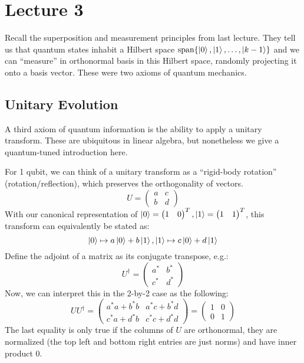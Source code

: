
\section{Lecture 3}

Recall the superposition and measurement principles from last lecture. They tell us that quantum states inhabit a Hilbert space
$\text{span}\{\ket{0}, \ket{1}, \dots, \ket{k - 1}\}$ and we can ``measure'' in orthonormal basis in this Hilbert space, randomly projecting it onto
a basis vector. These were two axioms of quantum mechanics.

\subsection{Unitary Evolution}
A third axiom of quantum information is the ability to apply a unitary transform. These are ubiquitous in linear algebra,
but nonetheless we give a quantum-tuned introduction here.

For 1 qubit, we can think of a unitary transform as a ``rigid-body rotation'' (rotation/reflection), which preserves the orthogonality of vectors.
\[ U = \begin{pmatrix}
    a & c \\ b & d
\end{pmatrix} \]
With our canonical representation of $\ket{0} = \begin{pmatrix}
    1 & 0
\end{pmatrix}^T, \ket{1} = \begin{pmatrix}
    1 & 1
\end{pmatrix}^T$, this transform can equivalently be stated as:
\[ \ket{0} \mapsto a\ket{0} + b \ket{1}, \ket{1} \mapsto c \ket{0} + d \ket{1} \]
Define the adjoint of a matrix as its conjugate transpose, e.g.:
\[ U^{\dagger} = \begin{pmatrix}
    a^* & b^* \\ c^* & d^*
\end{pmatrix} \]
Now, we can interpret this in the 2-by-2 case as the following:
\[ UU^{\dagger} = \begin{pmatrix}
    a^* a + b^* b & a^* c + b^* d \\
    c^* a + d^* b & c^* c + d^* d
\end{pmatrix} = \begin{pmatrix}
    1 & 0 \\ 0 & 1
\end{pmatrix} \]
The last equality is only true if the columns of $U$ are orthonormal, they are normalized (the top left and bottom right entries are just norms) and have inner product 0.

